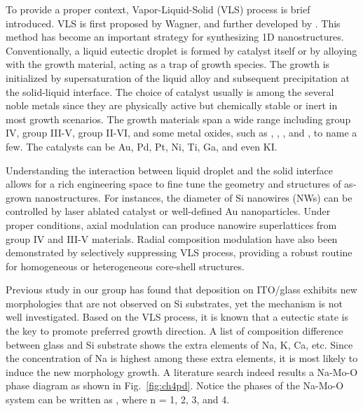 To provide a proper context, Vapor-Liquid-Solid (VLS) process is brief introduced. VLS is first proposed by Wagner,\cite{Wagner1964} and further developed by \citeauthor{Givargizov1975}.\cite{Givargizov1975} This method has become an important strategy for synthesizing 1D nanostructures.\cite{Lieber1998} Conventionally, a liquid eutectic droplet is formed by catalyst itself or by alloying with the growth material, acting as a trap of growth species. The growth is initialized by supersaturation of the liquid alloy and subsequent precipitation at the solid-liquid interface. The choice of catalyst usually is among the several noble metals since they are physically active but chemically stable or inert in most growth scenarios. The growth materials span a wide range including group IV,\cite{Hochbaum2005} group III-V,\citep{Dalacu2013, Xiao2012, Dubrovskii2011} group II-VI,\cite{Hao2006} and some metal oxides, such as ,\citep{Huang2001a,Ramgir2010} ,\citep{HEUER1967, Nagashima2007} ,\cite{Pan2002} and ,\cite{Zhuge2012} to name a few. The catalysts can be Au, Pd, Pt, Ni,\cite{Xiao2012} Ti, Ga,\cite{Pan2002} and even KI.

Understanding the interaction between liquid droplet and the solid interface allows for a rich engineering space to fine tune the geometry and structures of as-grown nanostructures. For instances, the diameter of Si nanowires (NWs) can be controlled by laser ablated catalyst\cite{Morales1998} or well-defined Au nanoparticles.\cite{Cui2001b} Under proper conditions, axial modulation can produce nanowire superlattices from group IV and III-V materials.\citep{Gudiksen2002,Bjork2002}  Radial composition modulation have also been demonstrated by selectively suppressing VLS process, providing a robust routine for homogeneous or heterogeneous core-shell structures.\cite{Lauhon2002a}  

Previous study in our group has found that  deposition on ITO/glass exhibits new morphologies that are not observed on Si substrates, yet the mechanism is not well investigated.\cite{predeep2011} Based on the VLS process, it is known that a eutectic state is the key to promote preferred growth direction. A list of composition difference between glass and Si substrate shows the extra elements of Na, K, Ca, etc. Since the concentration of Na is highest among these extra elements, it is most likely to induce the new morphology growth. A literature search indeed results a Na-Mo-O phase diagram as shown in Fig.~\ref{fig:ch4pd}.\cite{Hoermann1929} Notice the phases of the Na-Mo-O system can be written as , where n = 1, 2, 3, and 4. 

